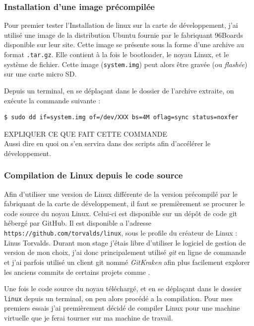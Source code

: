 \subsubsection{Installation d'une image précompilée}

Pour premier tester l'Installation de linux sur la carte de développement, j'ai utilisé une image de la distribution Ubuntu fournie par le fabriquant 96Boards disponible sur leur site. Cette image se présente sous la forme d'une archive au format \texttt{.tar.gz}. Elle contient à la fois le \gls{bootloader}, le noyau Linux, et le système de fichier. Cette image (\texttt{system.img}) peut alors être gravée (ou \textit{flashée}) sur une carte micro SD. 

Depuis un terminal, en se déplaçant dans le dossier de l'archive extraite, on exécute la commande suivante : 
\begin{lstlisting}[style=command]
$ sudo dd if=system.img of=/dev/XXX bs=4M oflag=sync status=noxfer
\end{lstlisting}

\begin{center}
    \color{red}
    EXPLIQUER CE QUE FAIT CETTE COMMANDE \\
    Aussi dire en quoi on s'en servira dans des scripts afin d'accélérer le développement.
\end{center}


\subsubsection{Compilation de Linux depuis le code source}\label{sec:compilation-linux-source}

Afin d'utiliser une version de Linux différente de la version précompilé par le fabriquant de la carte de développement, il faut se premièrement se procurer le code source du noyau Linux. Celui-ci est disponible sur un dépôt de code \gls{git} hébergé par GitHub. Il est disponible a l'adresse \texttt{https://github.com/torvalds/linux}, sous le profile du créateur de Linux : Linus Torvalds. Durant mon stage j'étais libre d'utiliser le logiciel de gestion de version de mon choix, j'ai donc principalement utilisé \textit{git} en ligne de commande et j'ai parfois utilisé un client git nommé \textit{GitKraken} afin plus facilement explorer les anciens commits de certains projets comme \litmus.

Une fois le code source du noyau téléchargé, et en se déplaçant dans le dossier \texttt{linux} depuis un terminal, on peu alors procédé a la compilation. Pour mes premiers essais j'ai premièrement décidé de compiler Linux pour une machine virtuelle que je ferai tourner sur ma machine de travail.

